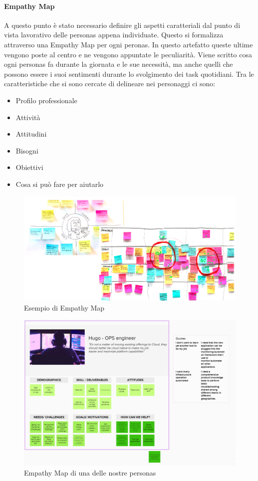 \paragraph{Empathy Map}
A questo punto è stato necessario definire gli aspetti caratteriali dal punto di vista lavorativo delle personas appena individuate. Questo si formalizza attraverso una Empathy Map per ogni peronas. In questo artefatto queste ultime vengono poste al centro e ne vengono appuntate le peculiarità. Viene scritto cosa ogni personas fa durante la giornata e le sue necessità, ma anche quelli che possono essere i suoi sentimenti durante lo svolgimento dei task quotidiani. Tra le caratteristiche che si sono cercate di delineare nei personaggi ci sono:
\begin{itemize}
	\item Profilo professionale
	\item Attività
	\item Attitudini
	\item Bisogni
	\item Obiettivi
	\item Cosa si può fare per aiutarlo
\end{itemize}
\begin{figure} [h!]
	\centering
	\includegraphics[width=0.7\linewidth]{capitoli/imgs/empatymap}
	\caption{Esempio di Empathy Map}
	\label{fig:empatymap}
\end{figure}
\begin{figure} [h!]
	\centering
	\includegraphics[width=0.7\linewidth]{capitoli/imgs/HugoEM.PNG}
	\caption{Empathy Map di una delle nostre personas}
	\label{fig:hugoem}
\end{figure}

